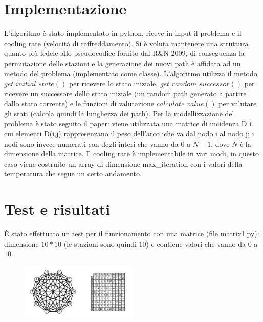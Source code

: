 \documentclass[11pt]{article}
\begin{document}
    \restoregeometry



    \section{Implementazione} \label{sec:implementation}

        L'algoritmo è stato implementato in python, riceve in input il problema e il cooling rate (velocità di raffreddamento).
        Si è voluta mantenere una struttura quanto più fedele allo pseudocodice fornito dal R&N 2009, di conseguenza la permutazione delle stazioni e
        la generazione dei nuovi path è affidata ad un metodo del problema (implementato come classe).
        L'algoritmo utilizza il metodo $get\_initial\_state()$ per ricevere lo stato iniziale, $get\_random\_successor()$ per ricevere un
        successore dello stato iniziale (un random path generato a partire dallo stato corrente) e le funzioni di valutazione $calculate\_value()$
        per valutare gli stati (calcola quindi la lunghezza dei path).
        Per la modellizzazione del problema è stato seguito il paper: viene utilizzata una matrice di incidenza D i cui elementi D(i,j) rappresenzano il
        peso dell'arco iche va dal nodo i al nodo j; i nodi sono invece numerati con degli interi che vanno da $0$ a $N-1$, dove $N$ è la dimensione della matrice.
        Il cooling rate è implementabile in vari modi, in questo caso viene costruito un array di dimensione max_iteration con i valori della temperatura che
        segue un certo andamento.

    \section{Test e risultati} \label{sec:test_and_results}

        È stato effettuato un test per il funzionamento con una matrice (file matrix1.py): dimensione $10*10$ (le stazioni sono quindi $10$) e
        contiene valori che vanno da $0$ a $10$.

        \begin{figure}[h]
            \centering
            \includegraphics[width=0.5\textwidth]{matrix1.png}
        \end{figure}
\end{document}
